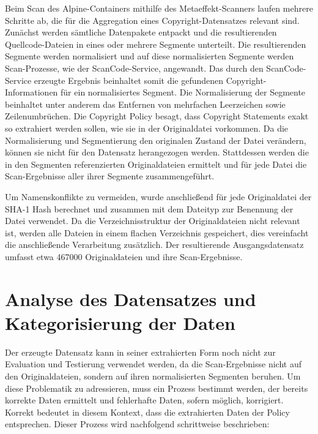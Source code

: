 Beim Scan des Alpine-Containers mithilfe des Metaeffekt-Scanners laufen mehrere Schritte ab, die für die Aggregation eines Copyright-Datensatzes relevant sind.
Zunächst werden sämtliche Datenpakete entpackt und die resultierenden Quellcode-Dateien in eines oder mehrere Segmente unterteilt.
Die resultierenden Segmente werden normalisiert und auf diese normalisierten Segmente werden Scan-Prozesse, wie der ScanCode-Service, angewandt.
Das durch den ScanCode-Service erzeugte Ergebnis beinhaltet somit die gefundenen Copyright-Informationen für ein normalisiertes Segment.
Die Normalisierung der Segmente beinhaltet unter anderem das Entfernen von mehrfachen Leerzeichen sowie Zeilenumbrüchen.
Die Copyright Policy besagt, dass Copyright Statements exakt so extrahiert werden sollen, wie sie in der Originaldatei vorkommen.
Da die Normalisierung und Segmentierung den originalen Zustand der Datei verändern, können sie nicht für den Datensatz herangezogen werden.
Stattdessen werden die in den Segmenten referenzierten Originaldateien ermittelt und für jede Datei die Scan-Ergebnisse aller ihrer Segmente zusammengeführt.

Um Namenskonflikte zu vermeiden, wurde anschließend für jede Originaldatei der SHA-1 Hash berechnet und zusammen mit dem Dateityp zur Benennung der Datei verwendet.
Da die Verzeichnisstruktur der Originaldateien nicht relevant ist, werden alle Dateien in einem flachen Verzeichnis gespeichert, dies vereinfacht die anschließende Verarbeitung zusätzlich.
Der resultierende Ausgangsdatensatz umfasst etwa 467000 Originaldateien und ihre Scan-Ergebnisse.

\section{Analyse des Datensatzes und Kategorisierung der Daten}\label{sec:analyse-datensatz}

Der erzeugte Datensatz kann in seiner extrahierten Form noch nicht zur Evaluation und Testierung verwendet werden, da die Scan-Ergebnisse nicht auf den Originaldateien, sondern auf ihren normalisierten Segmenten beruhen.
Um diese Problematik zu adressieren, muss ein Prozess bestimmt werden, der bereits korrekte Daten ermittelt und fehlerhafte Daten, sofern möglich, korrigiert.
Korrekt bedeutet in diesem Kontext, dass die extrahierten Daten der Policy entsprechen.
Dieser Prozess wird nachfolgend schrittweise beschrieben:

